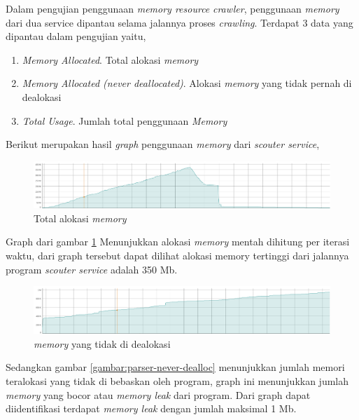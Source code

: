 Dalam pengujian penggunaan \emph{memory resource} \emph{crawler}, penggunaan \emph{memory} dari dua service dipantau selama jalannya proses \emph{crawling}. Terdapat 3 data yang dipantau dalam pengujian yaitu, 

\begin{enumerate}
  \item{\emph{Memory Allocated}. Total alokasi \emph{memory}}
  \item{\emph{Memory Allocated (never  deallocated)}. Alokasi \emph{memory} yang tidak pernah di dealokasi}
  \item{\emph{Total Usage}. Jumlah total penggunaan \emph{Memory}}
\end{enumerate}

Berikut merupakan hasil \emph{graph} penggunaan \emph{memory} dari \emph{scouter service},

\begin{figure}[H]
  \centering
  \includegraphics[keepaspectratio, width=15cm]{gambar/graph/scouter-total-alloc.png}
  \caption{Total alokasi \emph{memory}}
  \label{gambar:scouter-total-alloc}
\end{figure}

Graph dari gambar \ref{gambar:scouter-total-alloc} Menunjukkan alokasi \emph{memory} mentah dihitung per iterasi waktu, dari graph tersebut dapat dilihat alokasi memory tertinggi dari jalannya program \emph{scouter service} adalah 350 Mb.

\begin{figure}[H]
  \centering
  \includegraphics[keepaspectratio, width=15cm]{gambar/graph/scouter-never-dealloc.png}
  \caption{\emph{memory} yang tidak di dealokasi}
  \label{gambar:scouter-never-dealloc}
\end{figure}

Sedangkan gambar \ref{gambar:parser-never-dealloc} menunjukkan jumlah memori teralokasi yang tidak di bebaskan oleh program, graph ini menunjukkan jumlah \emph{memory} yang bocor atau \emph{memory leak} dari program. Dari graph dapat diidentifikasi terdapat \emph{memory leak} dengan jumlah maksimal 1 Mb.

